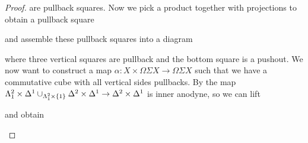 \begin{lemma}
\begin{proof}
        are pullback squares.
        Now we pick a product together with projections to obtain a pullback square 
        \begin{center}
        \end{center}
        and assemble these pullback squares into a diagram
        \begin{center}
        \end{center}
        where three vertical squares are pullback and the bottom square is a pushout.
        We now want to construct a map $\alpha\colon X\times\Omega\Sigma X\to\Omega\Sigma X$ such that we have a commutative cube with all vertical sides pullbacks.
        By %
        the map $\Lambda_1^2\times\Delta^1\cup_{\Lambda_1^2\times\left\lbrace1\right\rbrace}\Delta^2\times\Delta^1\to\Delta^2\times\Delta^1$ is inner anodyne, so we can lift
        \begin{center}
        \end{center}
        and obtain 
        \begin{center}

\end{center}
\end{proof}
\end{lemma}
